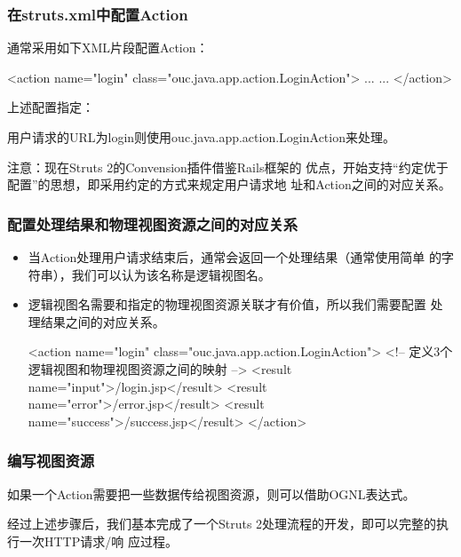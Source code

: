 \begin{frame}[fragile] %
\frametitle{ 在struts.xml中配置Action}

通常采用如下XML片段配置Action：

\begin{xmlCode}
<action name="login" class="ouc.java.app.action.LoginAction">
  ... ...
</action>
\end{xmlCode}

上述配置指定：

用户请求的URL为login则使用ouc.java.app.action.LoginAction来处理。

{\Blue\kai\scriptsize 注意：现在Struts 2的Convension插件借鉴Rails框架的
  优点，开始支持“约定优于配置”的思想，即采用约定的方式来规定用户请求地
  址和Action之间的对应关系。}
\end{frame}

\begin{frame}[fragile] %
\frametitle{ 配置处理结果和物理视图资源之间的对应关系}
\begin{itemize}
\item 当Action处理用户请求结束后，通常会返回一个处理结果（通常使用简单
  的字符串），我们可以认为该名称是{\hei\Red 逻辑视图名}。
\item 逻辑视图名需要和指定的物理视图资源关联才有价值，所以我们需要配置
  处理结果之间的对应关系。

\begin{xmlCode}
<action name="login" class="ouc.java.app.action.LoginAction">
  <!-- 定义3个逻辑视图和物理视图资源之间的映射 -->
  <result name="input">/login.jsp</result>
  <result name="error">/error.jsp</result>
  <result name="success">/success.jsp</result>
</action>  
\end{xmlCode}
\end{itemize}
\end{frame}

\begin{frame}[fragile] %
  \frametitle{ 编写视图资源}

  如果一个Action需要把一些数据传给视图资源，则可以借助{\Red\hei OGNL表达式}。

  经过上述步骤后，我们基本完成了一个Struts 2处理流程的开发，即可以完整的执行一次HTTP请求/响
  应过程。
\end{frame}

